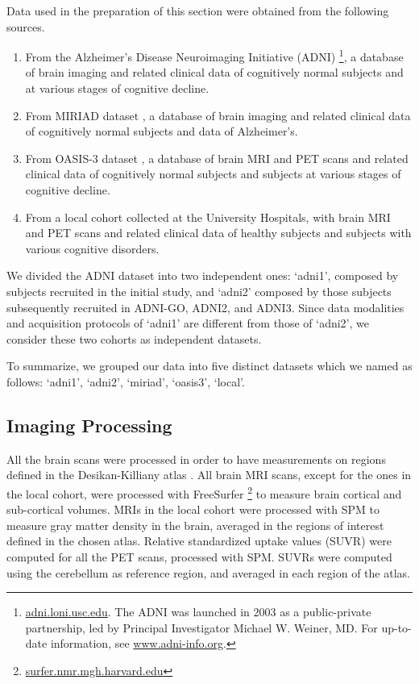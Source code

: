 Data used in the preparation of this section were obtained from the following sources.
\begin{enumerate}
%
\item From the Alzheimer's Disease Neuroimaging Initiative (ADNI)
\footnote{
\href{http://adni.loni.usc.edu}{adni.loni.usc.edu}.
The ADNI was launched in 2003 as a public-private partnership, led by Principal Investigator Michael W. Weiner, MD. For up-to-date information, see \href{www.adni-info.org}{www.adni-info.org}.
},
a database of brain imaging and related clinical data of cognitively normal subjects and at various stages of cognitive decline.
%
\item From MIRIAD dataset \cite{Miriad}, a database of brain imaging and related clinical data of cognitively normal subjects and data of Alzheimer's.
%
\item From OASIS-3 dataset \citep{oasis3}, a database of brain MRI and PET scans and related clinical data of cognitively normal subjects and subjects at various stages of cognitive decline.
%
\item From a local cohort collected at the University Hospitals, with brain MRI and PET scans and related clinical data of healthy subjects and subjects with various cognitive disorders.
\end{enumerate}
We divided the ADNI dataset into two independent ones:
`adni1', composed by subjects recruited in the initial study,
and `adni2' composed by those subjects subsequently recruited in ADNI-GO, ADNI2, and ADNI3.
Since data modalities and acquisition protocols of `adni1' are different from those of `adni2', we consider these two cohorts as independent datasets.

To summarize, we grouped our data into five distinct datasets which we named as follows: `adni1', `adni2', `miriad', `oasis3', `local'.

\subsection{Imaging Processing}
All the brain scans were processed in order to have measurements on regions defined in the Desikan-Killiany atlas \citep{Desikan2006}.
All brain MRI scans, except for the ones in the local cohort, were processed with FreeSurfer \footnote{\href{https://surfer.nmr.mgh.harvard.edu/}{surfer.nmr.mgh.harvard.edu}} \citep{freesurfer} to measure brain cortical and sub-cortical volumes.
MRIs in the local cohort were processed with SPM \citep{Ashburner2000} to measure gray matter density in the brain, averaged in the regions of interest defined in the chosen atlas.
Relative standardized uptake values (SUVR) were computed for all the PET scans, processed with SPM.
SUVRs were computed using the cerebellum as reference region, and averaged in each region of the atlas.

